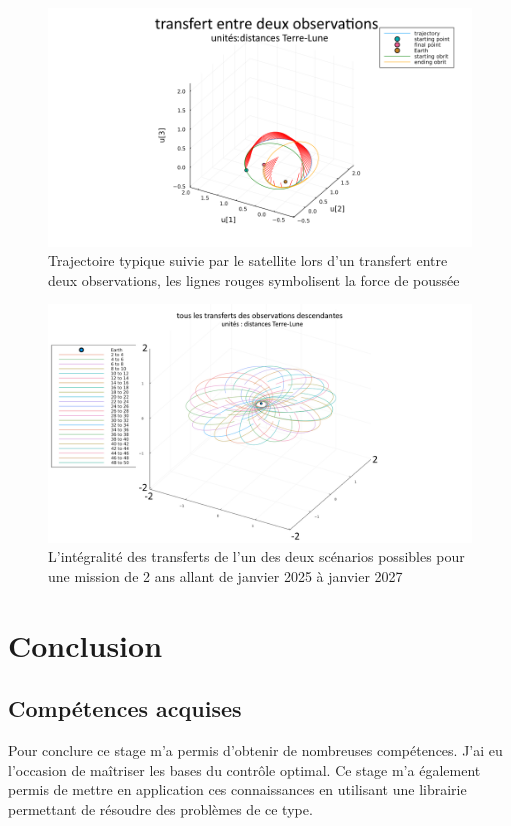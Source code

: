 \documentclass[11pt]{article} %
\begin{document}
		\begin{figure}[H]
			\centering
			\includegraphics[width=0.9\linewidth]{images/Transfert_23_25}
			\caption{Trajectoire typique suivie par le satellite lors d'un transfert entre deux observations, les lignes rouges symbolisent la force de poussée}
		\end{figure}
		\begin{figure}[H]
			\centering
			\includegraphics[width=0.9\linewidth]{images/All_transfert_even_48_50}
			\caption{L'intégralité des transferts de l'un des deux scénarios possibles pour une mission de 2 ans allant de janvier 2025 à janvier 2027}
		\end{figure}
		\newpage
		\section{Conclusion}
		\subsection{Compétences acquises}
		Pour conclure ce stage m'a permis d'obtenir de nombreuses compétences.
		J'ai eu l'occasion de maîtriser les bases du contrôle optimal. Ce stage m'a également permis de mettre en application ces connaissances en utilisant une librairie permettant de résoudre des problèmes de ce type.
		
\end{document}

